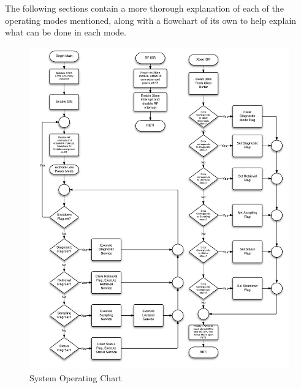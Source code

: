 The following sections contain a more thorough explanation of each of the operating modes mentioned, along with a flowchart of its own to help explain what can be done in each mode.
\begin{figure}[H]
	\centering
	\includegraphics[scale=0.8]{img/SystemFlowchart}
	\caption{System Operating Chart \label{fig:systemFlowchart}}
\end{figure}

